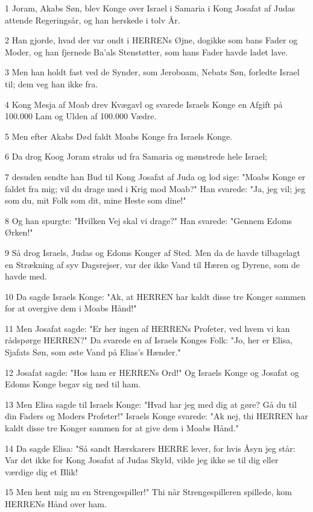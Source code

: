 \par 1 Joram, Akabs Søn, blev Konge over Israel i Samaria i Kong Josafat af Judas attende Regeringsår, og han herskede i tolv År.
\par 2 Han gjorde, hvad der var ondt i HERRENs Øjne, dogikke som bans Fader og Moder, og han fjernede Ba'als Stenstøtter, som hans Fader havde ladet lave.
\par 3 Men han holdt fast ved de Synder, som Jeroboam, Nebats Søn, forledte Israel til; dem veg han ikke fra.
\par 4 Kong Mesja af Moab drev Kvægavl og svarede Israels Konge en Afgift på 100.000 Lam og Ulden af 100.000 Vædre.
\par 5 Men efter Akabs Død faldt Moabs Konge fra Israels Konge.
\par 6 Da drog Koog Joram straks ud fra Samaria og mønstrede hele Israel;
\par 7 desuden sendte han Bud til Kong Josafat af Juda og lod sige: "Moabs Konge er faldet fra mig; vil du drage med i Krig mod Moab?" Han svarede: "Ja, jeg vil; jeg som du, mit Folk som dit, mine Heste som dine!"
\par 8 Og han spurgte: "Hvilken Vej skal vi drage?" Han svarede: "Gennem Edoms Ørken!"
\par 9 Så drog Israels, Judas og Edoms Konger af Sted. Men da de havde tilbagelagt en Strækning af syv Dagsrejser, var der ikke Vand til Hæren og Dyrene, som de havde med.
\par 10 Da sagde Israels Konge: "Ak, at HERREN har kaldt disse tre Konger sammen for at overgive dem i Moabs Hånd!"
\par 11 Men Josafat sagde: "Er her ingen af HERRENs Profeter, ved hvem vi kan rådspørge HERREN?" Da svarede en af Israels Konges Folk: "Jo, her er Elisa, Sjafats Søn, som øste Vand på Elias's Hænder."
\par 12 Josafat sagde: "Hos ham er HERRENs Ord!" Og Israels Konge og Josafat og Edoms Konge begav sig ned til ham.
\par 13 Men Elisa sagde til Israels Konge: "Hvad har jeg med dig at gøre? Gå du til din Faders og Moders Profeter!" Israels Konge svarede: "Ak nej, thi HERREN har kaldt disse tre Konger sammen for at give dem i Moabs Hånd."
\par 14 Da sagde Elisa: "Så sandt Hærskarers HERRE lever, for hvis Åsyn jeg står: Var det ikke for Kong Josafat af Judas Skyld, vilde jeg ikke se til dig eller værdige dig et Blik!
\par 15 Men hent mig nu en Strengespiller!" Thi når Strengespilleren spillede, kom HERRENs Hånd over ham.
